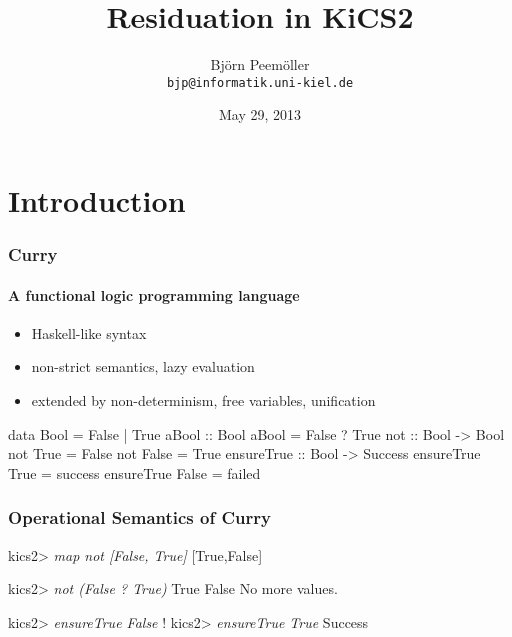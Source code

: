 \documentclass[
,hyperref={pdfpagelabels=false}
,xcolor=dvipsnames
]{beamer}
\title{Residuation in KiCS2}
\date{May 29, 2013}
\author[Björn Peemöller]{\texorpdfstring
{Björn Peemöller\\\texttt{bjp@informatik.uni-kiel.de}}
{Björn Peemöller}
}
\institute{Kiel University}
\begin{document}
\begin{frame}
\titlepage
\end{frame}


\section{Introduction}

\begin{frame}[fragile]%
\frametitle{Curry}
\framesubtitle{A functional logic programming language}

\begin{itemize}
\item Haskell-like syntax
\item non-strict semantics, lazy evaluation
\item extended by non-determinism, free variables, unification
\end{itemize}

\begin{curry}
data Bool = False | True \medskip
aBool :: Bool
aBool = False ? True \medskip
not :: Bool -> Bool
not True  = False
not False = True \medskip
ensureTrue :: Bool -> Success
ensureTrue True  = success
ensureTrue False = failed
\end{curry}
\end{frame}

\begin{frame}[fragile]%
\frametitle{Operational Semantics of Curry}

\begin{kics2}
kics2> \textsl{map not [False, True]}
[True,False]
\end{kics2}
\pause
\begin{kics2}
kics2> \textsl{not (False ? True)}
True
False
No more values.
\end{kics2}
\pause
\begin{kics2}
kics2> \textsl{ensureTrue False}
!
kics2> \textsl{ensureTrue True}
Success
\end{kics2}
\end{frame}
\end{document}
